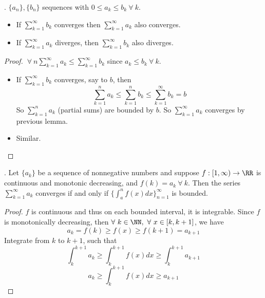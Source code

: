 \documentclass[12pt]{scrartcl}
\begin{document}
\begin{corollary}
  . $\{a_n\}, \{b_n\}$ sequences with $0 \leq a_k \leq b_k \ \forall \ k$. 
  \begin{itemize}
    \item If $\sum_{k=1}^\infty b_k$ converges then $\sum_{k=1}^\infty a_k$ also converges. 
    \item If $\sum_{k=1}^\infty a_k$ diverges, then $\sum_{k=1}^\infty b_k$ also diverges.
  \end{itemize}
  \begin{proof}
    $\ \forall \ n \sum_{k=1}^\infty a_k \leq \sum_{k=1}^\infty b_k$ since $a_k \leq b_k \ \forall \ k$. 
    \begin{itemize}
      \item If $\sum_{k=1}^\infty b_k$ converges, say to $b$, then 
      \[\sum_{k=1}^n a_k \leq \sum_{k=1}^n b_k \leq \sum_{k=1}^\infty b_k = b\]
      So $\sum_{k=1}^n a_k$ (partial sums) are bounded by $b$. So $\sum_{k=1}^\infty a_k$ converges by 
      previous lemma. 
      \item Similar.
    \end{itemize}
  \end{proof}
\end{corollary}

\begin{theorem}
  . Let $\{a_k\}$ be a sequence of nonnegative numbers and suppose $f: [1, \infty) \to \RR$
  is continuous and monotonic decreasing, and $f(k) = a_k \ \forall \ k$.
  Then the series $\sum_{k=1}^\infty a_k$ converges if and only if $\{\int_a^n f(x) dx\}_{n=1}^\infty$ is bounded.
  \begin{proof}
    $f$ is continuous and thus on each bounded interval, it is integrable. Since $f$ is monotonically decreasing, 
    then $\forall \ k \in \NN, \ \forall \ x \in [k, k + 1]$, we have 
    \[a_k = f(k) \geq f(x) \geq f(k + 1) = a_{k+1}\]
    Integrate from $k$ to $k+1$, such that 
    \[\int_k^{k + 1} a_k \geq \int_k^{k+1} f(x) dx \geq \int_k^{k+1}a_{k+1}\]
    \[a_k \geq \int_k^{k+1} f(x) dx \geq a_{k+1}\]
  \end{proof}
\end{theorem}
\end{document}
